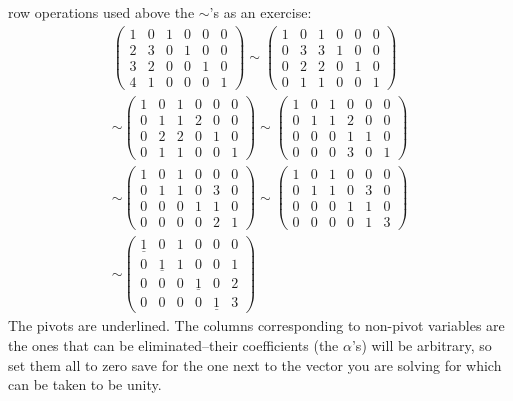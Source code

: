 {row operations used above the $\sim$'s as an exercise:
\begin{gather*}
\begin{pmatrix}
1&0&1&0&0&0\\
2&3&0&1&0&0\\
3&2&0&0&1&0\\
4&1&0&0&0&1
\end{pmatrix}\sim
\begin{pmatrix}
1&0&1&0&0&0\\
0&3&3&1&0&0\\
0&2&2&0&1&0\\
0&1&1&0&0&1
\end{pmatrix}
\\
\sim
\begin{pmatrix}
1&0&1&0&0&0\\
0&1&1&2&0&0\\
0&2&2&0&1&0\\
0&1&1&0&0&1
\end{pmatrix}
\sim
\begin{pmatrix}
1&0&1&0&0&0\\
0&1&1&2&0&0\\
0&0&0&1&1&0\\
0&0&0&3&0&1
\end{pmatrix}
\\
\sim
\begin{pmatrix}
1&0&1&0&0&0\\
0&1&1&0&3&0\\
0&0&0&1&1&0\\
0&0&0&0&2&1
\end{pmatrix}
\sim
\begin{pmatrix}
1&0&1&0&0&0\\
0&1&1&0&3&0\\
0&0&0&1&1&0\\
0&0&0&0&1&3
\end{pmatrix}
\\
\sim
\begin{pmatrix}
\underline1&0&1&0&0&0\\
0&\underline1&1&0&0&1\\
0&0&0&\underline1&0&2\\
0&0&0&0&\underline1&3
\end{pmatrix}
\end{gather*}
The pivots are underlined.
The columns corresponding to non-pivot variables are the ones that can be eliminated--their coefficients (the $\alpha$'s)
will be arbitrary, so set them all to zero save for the one next to the vector you are solving for which can be taken to be unity.
}

